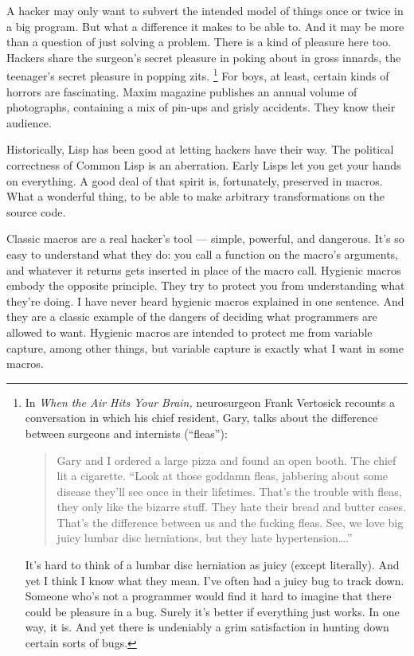 A hacker may only want to subvert the intended model of things once or
twice in a big program. But what a difference it makes to be able to.
And it may be more than a question of just solving a problem. There is a
kind of pleasure here too. Hackers share the surgeon's secret pleasure
in poking about in gross innards, the teenager's secret pleasure in
popping zits. \footnote{In \emph{When the Air Hits Your Brain,} neurosurgeon Frank
Vertosick recounts a conversation in which his chief resident, Gary,
talks about the difference between surgeons and internists (``fleas''):

\begin{quote}
Gary and I ordered a large pizza and found an open booth. The chief lit
a cigarette. ``Look at those goddamn fleas, jabbering about some disease
they'll see once in their lifetimes. That's the trouble with fleas, they
only like the bizarre stuff. They hate their bread and butter cases.
That's the difference between us and the fucking fleas. See, we love big
juicy lumbar disc herniations, but they hate hypertension\ldots.''
\end{quote}

It's hard to think of a lumbar disc herniation as juicy (except
literally). And yet I think I know what they mean. I've often had a
juicy bug to track down. Someone who's not a programmer would find it
hard to imagine that there could be pleasure in a bug. Surely it's
better if everything just works. In one way, it is. And yet there is
undeniably a grim satisfaction in hunting down certain sorts of bugs.} For boys, at least, certain kinds of horrors are
fascinating. Maxim magazine publishes an annual volume of photographs,
containing a mix of pin-ups and grisly accidents. They know their
audience.

Historically, Lisp has been good at letting hackers have their way. The
political correctness of Common Lisp is an aberration. Early Lisps let
you get your hands on everything. A good deal of that spirit is,
fortunately, preserved in macros. What a wonderful thing, to be able to
make arbitrary transformations on the source code.

Classic macros are a real hacker's tool --- simple, powerful, and
dangerous. It's so easy to understand what they do: you call a function
on the macro's arguments, and whatever it returns gets inserted in place
of the macro call. Hygienic macros embody the opposite principle. They
try to protect you from understanding what they're doing. I have never
heard hygienic macros explained in one sentence. And they are a classic
example of the dangers of deciding what programmers are allowed to want.
Hygienic macros are intended to protect me from variable capture, among
other things, but variable capture is exactly what I want in some
macros.


